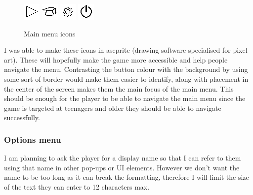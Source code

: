 \documentclass{article}
\begin{document}
\begin{figure}[H]
\centering
\includegraphics[width = 0.2\linewidth]{main_menu_play}
\includegraphics[width = 0.2\linewidth]{main_menu_tutorial}
\includegraphics[width = 0.2\linewidth]{main_menu_options}
\includegraphics[width = 0.2\linewidth]{main_menu_exit}
\caption{Main menu icons}
\label{main_menu_icons}
\end{figure}

I was able to make these icons in aseprite (drawing software specialised for pixel art). These will hopefully make the game more accessible and help people navigate the menu. Contrasting the button colour with the background by using some sort of border would make them easier to identify, along with placement in the center of the screen makes them the main focus of the main menu. This should be enough for the player to be able to navigate the main menu since the game is targeted at teenagers and older they should be able to navigate successfully.

\subsubsection{Options menu}
I am planning to ask the player for a display name so that I can refer to them using that name in other pop-ups or UI elements. However we don't want the name to be too long as it can break the formatting, therefore I will limit the size of the text they can enter to 12 characters max.
\end{document}
